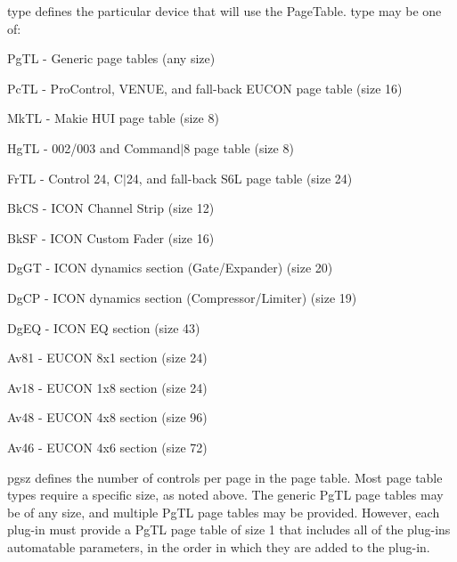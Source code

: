 \begin{DoxyItemize}
\begin{DoxyItemize}
\begin{DoxyEnumerate}
\item {\ttfamily type} defines the particular device that will use the {\ttfamily Page\+Table}. {\ttfamily type} may be one of\+:


\begin{DoxyItemize}
\item {\ttfamily Pg\+T\+L} -\/ Generic page tables (any size) 
\item {\ttfamily Pc\+T\+L} -\/ Pro\+Control, V\+E\+N\+U\+E, and fall-\/back E\+U\+C\+O\+N page table (size 16) 
\item {\ttfamily Mk\+T\+L} -\/ Makie H\+U\+I page table (size 8) 
\item {\ttfamily Hg\+T\+L} -\/ 002/003 and Command$\vert$8 page table (size 8) 
\item {\ttfamily Fr\+T\+L} -\/ Control 24, C$\vert$24, and fall-\/back S6\+L page table (size 24) 
\item {\ttfamily Bk\+C\+S} -\/ I\+C\+O\+N Channel Strip (size 12) 
\item {\ttfamily Bk\+S\+F} -\/ I\+C\+O\+N Custom Fader (size 16) 
\item {\ttfamily Dg\+G\+T} -\/ I\+C\+O\+N dynamics section (Gate/\+Expander) (size 20) 
\item {\ttfamily Dg\+C\+P} -\/ I\+C\+O\+N dynamics section (Compressor/\+Limiter) (size 19) 
\item {\ttfamily Dg\+E\+Q} -\/ I\+C\+O\+N E\+Q section (size 43) 
\item {\ttfamily Av81} -\/ E\+U\+C\+O\+N 8x1 section (size 24) 
\item {\ttfamily Av18} -\/ E\+U\+C\+O\+N 1x8 section (size 24) 
\item {\ttfamily Av48} -\/ E\+U\+C\+O\+N 4x8 section (size 96) 
\item {\ttfamily Av46} -\/ E\+U\+C\+O\+N 4x6 section (size 72)
\end{DoxyItemize}


\item {\ttfamily pgsz} defines the number of controls per page in the page table. Most page table types require a specific size, as noted above. The generic {\ttfamily Pg\+T\+L} page tables may be of any size, and multiple {\ttfamily Pg\+T\+L} page tables may be provided. However, each plug-\/in must provide a {\ttfamily Pg\+T\+L} page table of size 1 that includes all of the plug-\/in\textquotesingle{}s automatable parameters, in the order in which they are added to the plug-\/in.  
\end{DoxyEnumerate}
\end{DoxyItemize}
\end{DoxyItemize}

